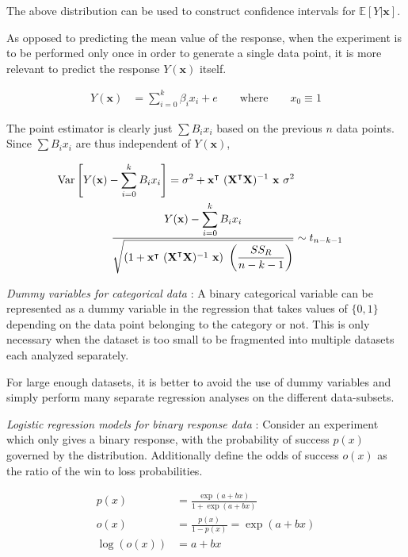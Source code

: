 The above distribution can be used to construct confidence intervals for $ \mathbb{E}[Y|\textbf{x}] $.

As opposed to predicting the mean value of the response, when the experiment is to be performed only once in order to generate a single data point, it is more relevant to predict the response $ Y(\textbf{x}) $ itself.

\begin{align}
	Y(\textbf{x}) &= \sum\limits_{i = 0}^{k} \beta_i x_i + e \qquad \text{where} \qquad x_0 \equiv 1
\end{align}

The point estimator is clearly just $ \sum B_i x_i $ based on the previous $ n $ data points. Since $ \sum B_i x_i $ are thus independent of $ Y(\textbf{x}) $,


\begin{align}
	\mathrm{Var}\left[ Y(\textbf{x}) - \sum\limits_{i = 0}^{k} B_i x_i \right] = \sigma^2 + \textbf{x}^\intercal \ (\textbf{X}^\intercal \textbf{X})^{-1}\ \textbf{x}\ \sigma^2 \\
	\frac{\displaystyle Y(\textbf{x}) - \sum\limits_{i = 0}^{k} B_i x_i}{\displaystyle \sqrt{\left(1 + \textbf{x}^\intercal \ (\textbf{X}^\intercal \textbf{X})^{-1}\ \textbf{x}\right)\ \left(\frac{SS_R}{n-k-1}\right)}} &\sim t_{n-k-1}
\end{align}

\textit{Dummy variables for categorical data} : A binary categorical variable can be represented as a dummy variable in the regression that takes values of $ \{0, 1\} $ depending on the data point belonging to the category or not. This is only necessary when the dataset is too small to be fragmented into multiple datasets each analyzed separately.

For large enough datasets, it is better to avoid the use of dummy variables and simply perform many separate regression analyses on the different data-subsets.

\textit{Logistic regression models for binary response data} : Consider an experiment which only gives a binary response, with the probability of success $ p(x) $ governed by the distribution. Additionally define the odds of success $ o(x) $ as the ratio of the win to loss probabilities.

\begin{align}
	p(x) &= \frac{\exp(a + bx)}{1 + \exp(a + bx)}  \\
	o(x) &= \frac{p(x)}{1 - p(x)} = \exp(a + bx) \\
	\log(o(x)) &= a + bx
\end{align}

